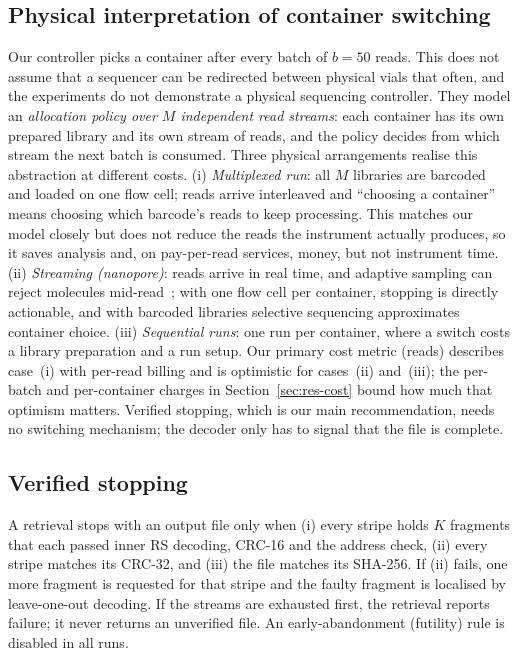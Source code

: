 \documentclass[acmsmall,screen]{acmart}
\begin{document}
\subsection{Physical interpretation of container switching}
\label{sec:ops}
Our controller picks a container after every batch of $b{=}50$ reads.  This does not assume that a
sequencer can be redirected between physical vials that often, and the experiments do not demonstrate a
physical sequencing controller.  They model an \emph{allocation policy over $M$ independent read
streams}: each container has its own prepared library and its own stream of reads, and the policy
decides from which stream the next batch is consumed.  Three physical arrangements realise this
abstraction at different costs.  (i) \emph{Multiplexed run}: all $M$
libraries are barcoded and loaded on one flow cell; reads arrive interleaved and ``choosing a
container'' means choosing which barcode's reads to keep processing.  This matches our model closely
but does not reduce the reads the instrument actually produces, so it saves analysis and, on
pay-per-read services, money, but not instrument time.  (ii) \emph{Streaming (nanopore)}: reads
arrive in real time, and adaptive sampling can reject molecules mid-read~\cite{loose2016real,payne2021readfish};
with one flow cell per container, stopping is directly actionable, and with barcoded libraries
selective sequencing approximates container choice.  (iii) \emph{Sequential runs}: one run per
container, where a switch costs a library preparation and a run setup.  Our primary cost metric (reads)
describes case~(i) with per-read billing and is optimistic for cases~(ii) and~(iii); the per-batch and
per-container charges in Section~\ref{sec:res-cost} bound how much that optimism matters.  Verified
stopping, which is our main recommendation, needs no switching mechanism; the decoder only has to
signal that the file is complete.


\subsection{Verified stopping}
A retrieval stops with an output file only when (i) every stripe holds $K$ fragments that each
passed inner RS decoding, CRC-16 and the address check, (ii) every stripe matches its CRC-32, and
(iii) the file matches its SHA-256.  If (ii) fails, one more fragment is requested for that
stripe and the faulty fragment is localised by leave-one-out decoding.  If the streams are
exhausted first, the retrieval reports failure; it never returns an unverified file.  An
early-abandonment (futility) rule is disabled in all runs.
\end{document}
